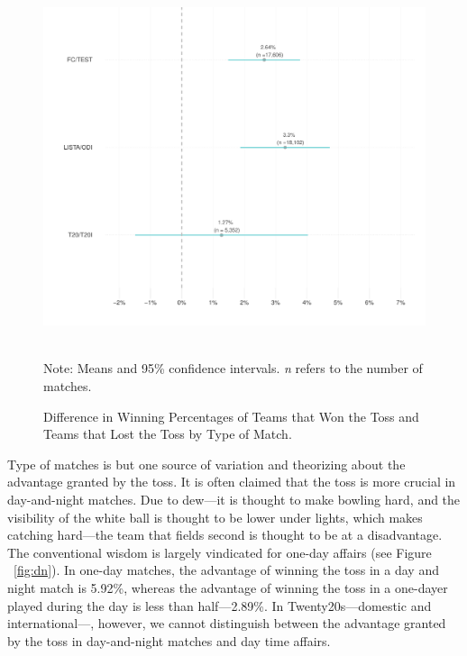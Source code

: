 \documentclass[12pt]{article}
\begin{document}
\begin{figure}[htbp]
\caption{Difference in Winning Percentages of Teams that Won the Toss and Teams that Lost the Toss by Type of Match.}
\centering
\includegraphics[scale=1]{../figs/winbyType.pdf}
{\footnotesize \\ Note: Means and 95\% confidence intervals. \emph{n} refers to the number of matches.\par}
\label{fig:type}
\end{figure}

Type of matches is but one source of variation and theorizing about the advantage granted by the toss. It is often claimed that the toss is more crucial in day-and-night matches. Due to dew---it is thought to make bowling hard, and the visibility of the white ball is thought to be lower under lights, which makes catching hard---the team that fields second is thought to be at a disadvantage. The conventional wisdom is largely vindicated for one-day affairs (see Figure ~\ref{fig:dn}). In one-day matches, the advantage of winning the toss in a day and night match is 5.92\%, whereas the advantage of winning the toss in a one-dayer played during the day is less than half---2.89\%. In Twenty20s---domestic and international---, however, we cannot distinguish between the advantage granted by the toss in day-and-night matches and day time affairs.
\end{document}
